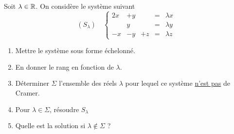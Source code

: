 \documentclass[a4paper, 11pt,reqno]{article}
\begin{document}
\begin{exercice}
Soit $\lambda \in \mathbb{R}$. On considère le système suivant 
$$(S_\lambda)\quad  \left\{ \begin{array}{ccccc}
2x &+y& & =& \lambda x\\
 &y & & =& \lambda y \\
 -x&-y&+z&=&\lambda z
\end{array}\right. $$

\begin{enumerate}
\item Mettre le système sous forme échelonné. 
\item En donner le rang en fonction de $\lambda$. 
\item Déterminer $\Sigma$ l'ensemble des réels $\lambda$ pour lequel ce système \underline{n'est pas} de Cramer. 
\item Pour $\lambda \in \Sigma$, résoudre $S_\lambda$
\item Quelle est la solution si $\lambda \notin \Sigma$ ? 
\end{enumerate}
\end{exercice}
\end{document}
